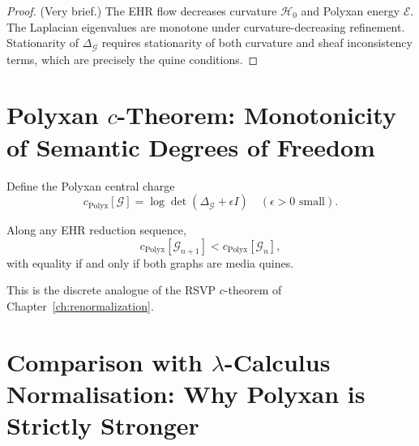 \begin{proof}
(Very brief.)
The EHR flow decreases curvature $\mathcal{H}_0$ and Polyxan energy $\mathcal{E}$.
The Laplacian eigenvalues are monotone under curvature-decreasing refinement.
Stationarity of $\Delta_{\mathcal{G}}$ requires stationarity of both curvature and
sheaf inconsistency terms, which are precisely the quine conditions.
\end{proof}

\section{Polyxan \texorpdfstring{$c$}{c}-Theorem: Monotonicity of Semantic Degrees of Freedom}

Define the Polyxan central charge
\[
c_{\mathrm{Polyx}}[\mathcal{G}]
= \log \det(\Delta_{\mathcal{G}} + \epsilon I)
\quad (\epsilon > 0 \text{ small}).
\]

\begin{theorem}
Along any EHR reduction sequence,
\[
c_{\mathrm{Polyx}}[\mathcal{G}_{n+1}]
< c_{\mathrm{Polyx}}[\mathcal{G}_{n}],
\]
with equality if and only if both graphs are media quines.
\end{theorem}

This is the discrete analogue of the RSVP $c$-theorem of Chapter~\ref{ch:renormalization}.

\section*{Comparison with $\lambda$-Calculus Normalisation: Why Polyxan is Strictly Stronger}

